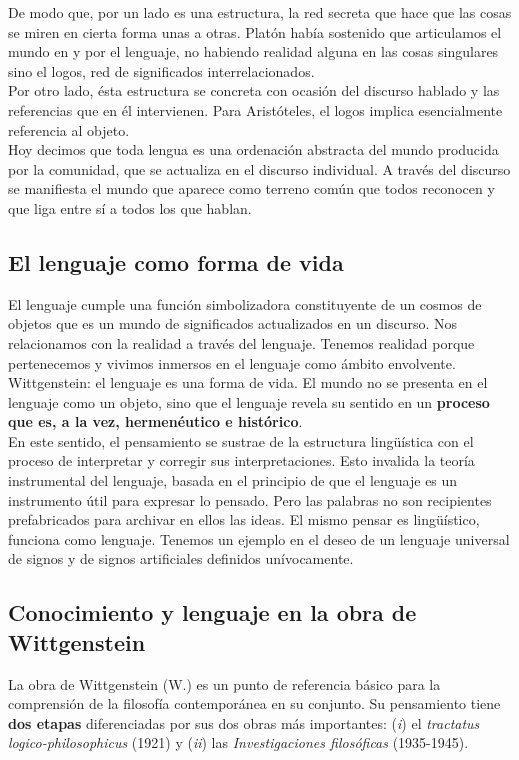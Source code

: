 \documentclass[a4paper, 11pt, twocolumn, spanish]{article}
\begin{document}
De modo que, por un lado es una estructura, la red secreta que hace
que las cosas se miren en cierta forma unas a otras. Platón había
sostenido que articulamos el mundo en y por el lenguaje, no habiendo
realidad alguna en las cosas singulares sino el logos, red de
significados interrelacionados.\\
Por otro lado, ésta estructura se concreta con ocasión del discurso
hablado y las referencias que en él intervienen. Para Aristóteles, el
logos implica esencialmente referencia al objeto.\\
Hoy decimos que toda lengua es una ordenación abstracta del mundo
producida por la comunidad, que se actualiza en el discurso
individual. A través del discurso se manifiesta el mundo que aparece
como terreno común que todos reconocen y que liga entre sí a todos los
que hablan.

\subsection{El lenguaje como forma de vida}
\label{sec:orgf172404}
El lenguaje cumple una función simbolizadora constituyente de un
cosmos de objetos que es un mundo de significados actualizados en un
discurso. Nos relacionamos con la realidad a través del
lenguaje. Tenemos realidad porque pertenecemos y vivimos inmersos en
el lenguaje como ámbito envolvente. Wittgenstein: el lenguaje es una
forma de vida. El mundo no se presenta en el lenguaje como un objeto,
sino que el lenguaje revela su sentido en un \textbf{proceso que es, a la
vez, hermenéutico e histórico}.\\

En este sentido, el pensamiento se sustrae de la estructura
lingüística con el proceso de interpretar y corregir sus
interpretaciones. Esto invalida la teoría instrumental del lenguaje,
basada en el principio de que el lenguaje es un instrumento útil para
expresar lo pensado. Pero las palabras no son recipientes
prefabricados para archivar en ellos las ideas. El mismo pensar es
lingüístico, funciona como lenguaje. Tenemos un ejemplo en el deseo de
un lenguaje universal de signos y de signos artificiales definidos
unívocamente.

\subsection{Conocimiento y lenguaje en la obra de Wittgenstein}
\label{sec:org97ce863}
La obra de Wittgenstein (W.) es un punto de referencia básico para la
comprensión de la filosofía contemporánea en su conjunto. Su
pensamiento tiene \textbf{dos etapas} diferenciadas por sus dos obras más
importantes: (\emph{i}) el \emph{tractatus logico-philosophicus} (1921) y (\emph{ii}) las
\emph{Investigaciones filosóficas} (1935-1945).
\end{document}
